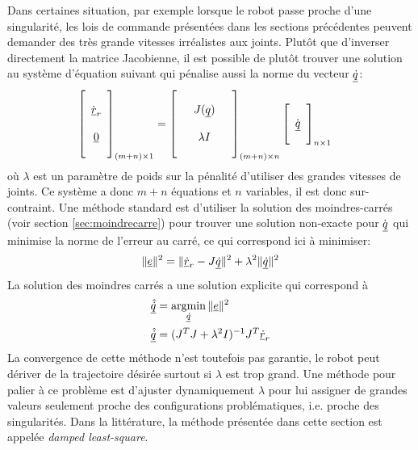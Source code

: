 Dans certaines situation, par exemple lorsque le robot passe proche d'une singularité, les lois de commande présentées dans les sections précédentes peuvent demander des très grande vitesses irréalistes aux joints. Plutôt que d'inverser directement la matrice Jacobienne, il est possible de plutôt trouver une solution au système d'équation suivant qui pénalise aussi la norme du vecteur $\underline{\dot{q}}$:
\begin{align}
\left[ \begin{array}{c}  \\ \dot{\underline{r}}_r \\ \\ \underline{0} \\ \\ 
\end{array} \right]_{(m+n) \times 1}
&= 
\left[ \begin{array}{c c c} 
&&\\
& J(\underline{q}) &\\
&&\\
&\lambda I &\\
&&
\end{array} \right]_{(m + n)  \times n}
\left[ \begin{array}{c} 
\\ \dot{\underline{q}} \\ \\
\end{array} \right]_{n \times 1}
\end{align} 
où $\lambda$ est un paramètre de poids sur la pénalité d'utiliser des grandes vitesses de joints. Ce système a donc $m+n$ équations et $n$ variables, il est donc sur-contraint. Une méthode standard est d'utiliser la solution des moindres-carrés (voir section \ref{sec:moindrecarre}) pour trouver une solution non-exacte pour $\dot{\underline{q}}$ qui minimise la norme de l'erreur au carré, ce qui correspond ici à minimiser:
\begin{align}
\| \underline{e} \|^2 = \| \underline{\dot{r}}_r - J \underline{\dot{q}}   \|^2 + \lambda^2 \| \underline{\dot{q}} \|^2
\end{align} 
La solution des moindres carrés a une solution explicite qui correspond à 
\begin{align}
\col{\hat{\dot{q}}} &= \operatornamewithlimits{argmin}\limits_{\col{\dot{q}}} \| \col{e} \|^2 \\
\col{\hat{\dot{q}}} &= \huge( J^T J + \lambda^2 I \huge)^{-1} J^T  \col{\dot{r}}_r 
\end{align} 
La convergence de cette méthode n'est toutefois pas garantie, le robot peut dériver de la trajectoire désirée surtout si $\lambda$ est trop grand. Une méthode pour palier à ce problème est d'ajuster dynamiquement $\lambda$ pour lui assigner de grandes valeurs seulement proche des configurations problématiques, i.e. proche des singularités. Dans la littérature, la méthode présentée dans cette section est appelée \textit{damped least-square}.


